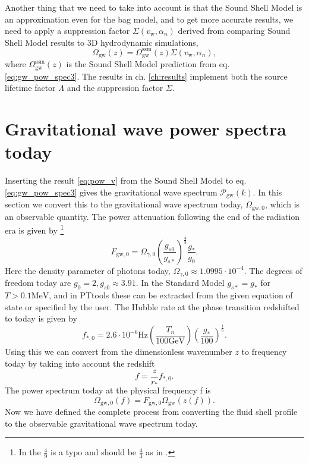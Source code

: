 Another thing that we need to take into account is that the Sound Shell Model is an approximation even for the bag model,
and to get more accurate results,
we need to apply a suppression factor $\Sigma(v_\text{w},\alpha_n)$ derived from comparing Sound Shell Model results to 3D hydrodynamic simulations,
\cite[eq. 2.9]{gowling_lisa_2021}
\begin{equation}
\Omega_\text{gw}(z) = \Omega_\text{gw}^\text{ssm}(z) \Sigma(v_\text{w},\alpha_n),
\end{equation}
where $\Omega_\text{gw}^\text{ssm}(z)$ is the Sound Shell Model prediction from eq. \eqref{eq:gw_pow_spec3}.
The results in ch. \ref{ch:results} implement both the source lifetime factor $\Lambda$ and the suppression factor $\Sigma$.


\section{Gravitational wave power spectra today}
\label{omgw0}
Inserting the result \eqref{eq:pow_v} from the Sound Shell Model to eq. \eqref{eq:gw_pow_spec3} gives the gravitational wave spectrum $\mathcal{P}_\text{gw}(k)$.
In this section we convert this to the gravitational wave spectrum today, $\Omega_{\text{gw},0}$, which is an observable quantity.
The power attenuation following the end of the radiation era is given by
\cites[eq. 2.11]{gowling_lisa_2021}[eq. 19]{caprini_detecting_2020}
\footnote{In \cite[eq. 2.11]{gowling_lisa_2021} the $\frac{4}{9}$ is a typo and should be $\frac{4}{3}$ as in \cite[eq. 19]{caprini_detecting_2020}.}
\begin{equation}
F_{\text{gw},0} = \Omega_{\gamma,0} \left( \frac{g_{s0}}{g_{s*}} \right)^\frac{4}{3} \frac{g_*}{g_0}.
\end{equation}
Here the density parameter of photons today, $\Omega_{\gamma,0} \approx 1.0995 \cdot 10^{-4}$.
The degrees of freedom today are $g_0 = 2, g_{s0} \approx 3.91$.
In the Standard Model $g_{s*} = g_*$ for $T > 0.1 \text{MeV}$,
and in PTtools these can be extracted from the given equation of state or specified by the user.
The Hubble rate at the phase transition redshifted to today is given by
\cites[eq. 2.13]{gowling_lisa_2021}[eq. 31]{caprini_detecting_2020}
\begin{equation}
f_{*,0} = 2.6 \cdot 10^{-6} \text{Hz} \left( \frac{T_n}{100 \text{GeV}} \right) \left( \frac{g_*}{100} \right)^\frac{1}{6}.
\end{equation}
Using this we can convert from the dimensionless wavenumber $z$ to frequency today by taking into account the redshift
\cite[eq. 2.12]{gowling_lisa_2021}
\begin{equation}
f = \frac{z}{r_*} f_{*,0}.
\end{equation}
The power spectrum today at the physical frequency f is
\cite[eq. 2.10]{gowling_lisa_2021}
\begin{equation}
\Omega_{\text{gw},0}(f) = F_{\text{gw},0} \Omega_\text{gw}(z(f)).
\end{equation}
Now we have defined the complete process from converting the fluid shell profile to the observable gravitational wave spectrum today.


